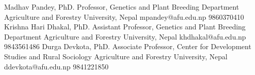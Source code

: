 \begin{cvhonors}
  \cvhonor
    {Madhav Pandey, PhD.}
    {Professor, Genetics and Plant Breeding Department}
    {Agriculture and Forestry University, Nepal}
    {mpandey@afu.edu.np}
    {9860370410}
  \cvhonor
    {Krishna Hari Dhakal, PhD.}
    {Assistant Professor, Genetics and Plant Breeding Department}
    {Agriculture and Forestry University, Nepal}
    {khdhakal@afu.edu.np}
    {9843561486}
   \cvhonor
   	{Durga Devkota, PhD.}
    {Associate Professor, Center for Development Studies and Rural Sociology}
    {Agriculture and Forestry University, Nepal}
    {ddevkota@afu.edu.np}
    {9841221850}
\end{cvhonors}
